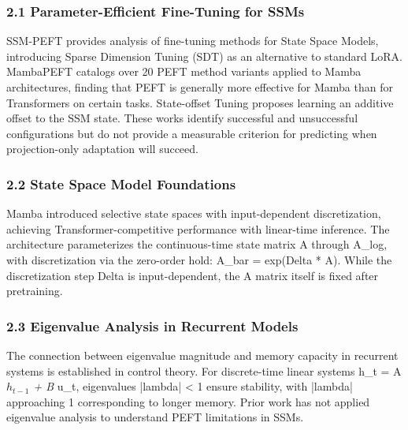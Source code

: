 
\subsubsection{2.1 Parameter-Efficient Fine-Tuning for SSMs}

SSM-PEFT provides analysis of fine-tuning methods for State Space Models, introducing Sparse Dimension Tuning (SDT) as an alternative to standard LoRA. MambaPEFT catalogs over 20 PEFT method variants applied to Mamba architectures, finding that PEFT is generally more effective for Mamba than for Transformers on certain tasks. State-offset Tuning proposes learning an additive offset to the SSM state. These works identify successful and unsuccessful configurations but do not provide a measurable criterion for predicting when projection-only adaptation will succeed.

\subsubsection{2.2 State Space Model Foundations}

Mamba introduced selective state spaces with input-dependent discretization, achieving Transformer-competitive performance with linear-time inference. The architecture parameterizes the continuous-time state matrix A through A\_log, with discretization via the zero-order hold: A\_bar = exp(Delta * A). While the discretization step Delta is input-dependent, the A matrix itself is fixed after pretraining.

\subsubsection{2.3 Eigenvalue Analysis in Recurrent Models}

The connection between eigenvalue magnitude and memory capacity in recurrent systems is established in control theory. For discrete-time linear systems h\_t = A \textit{ $h_{t-1}$ + B } u\_t, eigenvalues |lambda| < 1 ensure stability, with |lambda| approaching 1 corresponding to longer memory. Prior work has not applied eigenvalue analysis to understand PEFT limitations in SSMs.
